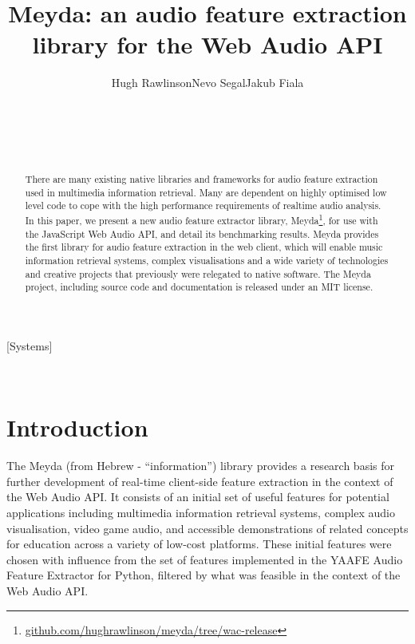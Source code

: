 \documentclass{sig-alternate}
\begin{document}
\title{Meyda: an audio feature extraction library for the Web Audio API}

\author{\hspace{-10 mm}Hugh Rawlinson\qquad Nevo Segal\qquad Jakub Fiala\vspace{2 mm}
\\\\
       \\
       \\
       \\
       \quad
       \quad
       \quad
}

\maketitle
\begin{abstract}
There are many existing native libraries and frameworks for audio feature extraction used in multimedia information retrieval. Many are dependent on highly optimised low level code to cope with the high performance requirements of realtime audio analysis. In this paper, we present a new audio feature extractor library, Meyda\footnote{\url{github.com/hughrawlinson/meyda/tree/wac-release}}, for use with the JavaScript Web Audio API, and detail its benchmarking results. Meyda provides the first library for audio feature extraction in the web client, which will enable music information retrieval systems, complex visualisations and a wide variety of technologies and creative projects that previously were relegated to native software. The Meyda project, including source code and documentation is released under an MIT license.
\end{abstract}

[Systems]


\\

\vspace{10mm}
\section{Introduction}
The Meyda (from Hebrew - ``information'') library provides a research basis for further development of real-time client-side feature extraction in the context of the Web Audio API. It consists of an initial set of useful features for potential applications including multimedia information retrieval systems, complex audio visualisation, video game audio, and accessible demonstrations of related concepts for education across a variety of low-cost platforms. These initial features were chosen with influence from the set of features implemented in the YAAFE Audio Feature Extractor for Python, filtered by what was feasible in the context of the Web Audio API.
\end{document}
